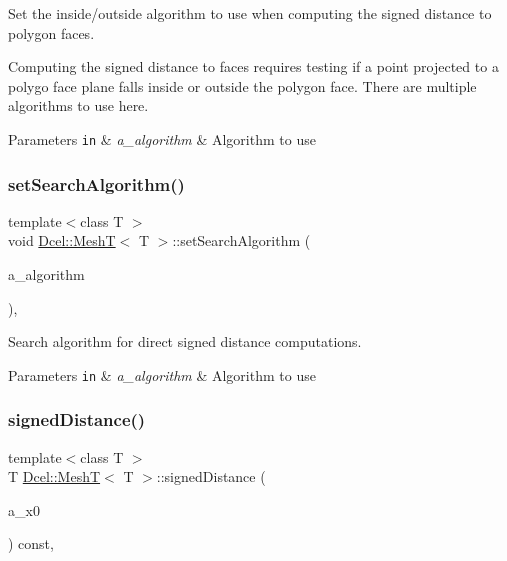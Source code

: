 Set the inside/outside algorithm to use when computing the signed distance to polygon faces. 

Computing the signed distance to faces requires testing if a point projected to a polygo face plane falls inside or outside the polygon face. There are multiple algorithms to use here. 
\begin{DoxyParams}[1]{Parameters}
\mbox{\tt in}  & {\em a\+\_\+algorithm} & Algorithm to use \\
\hline
\end{DoxyParams}
\mbox{\label{classDcel_1_1MeshT_abc7a2bd7632be06c0ad9cf49816d262f}} 
\subsubsection{\texorpdfstring{set\+Search\+Algorithm()}{setSearchAlgorithm()}}
{\footnotesize\ttfamily template$<$class T $>$ \\
void \hyperlink{classDcel_1_1MeshT}{Dcel\+::\+MeshT}$<$ T $>$\+::set\+Search\+Algorithm (\begin{DoxyParamCaption}\item[{const \hyperlink{classDcel_1_1MeshT_abb4c3bb7a52804bb041c133f30151399}{Search\+Algorithm}}]{a\+\_\+algorithm }\end{DoxyParamCaption})\hspace{0.3cm}{\ttfamily [inline]}, {\ttfamily [noexcept]}}



Search algorithm for direct signed distance computations. 


\begin{DoxyParams}[1]{Parameters}
\mbox{\tt in}  & {\em a\+\_\+algorithm} & Algorithm to use \\
\hline
\end{DoxyParams}
\mbox{\label{classDcel_1_1MeshT_aa6f614aa0d93c3345c10150168347497}} 
\subsubsection{\texorpdfstring{signed\+Distance()}{signedDistance()}\hspace{0.1cm}{\footnotesize\ttfamily [1/2]}}
{\footnotesize\ttfamily template$<$class T $>$ \\
T \hyperlink{classDcel_1_1MeshT}{Dcel\+::\+MeshT}$<$ T $>$\+::signed\+Distance (\begin{DoxyParamCaption}\item[{const \hyperlink{classDcel_1_1MeshT_a646c5d8f66b3079bca35fe4186493627}{Vec3} \&}]{a\+\_\+x0 }\end{DoxyParamCaption}) const\hspace{0.3cm}{\ttfamily [inline]}, {\ttfamily [noexcept]}}



